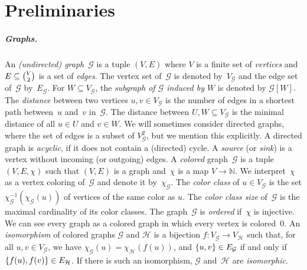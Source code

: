 \documentclass[10pt,a4paper]{article}
\newcommand{\defining}[1]{\emph{#1}}
\DeclarePairedDelimiter\set{\lbrace}{\rbrace}
\newcommand{\inv}[1]{#1^{-1}}
\newcommand{\nat}{\mathbb{N}}
\newcommand{\graphG}{\mathcal{G}}
\newcommand{\graphH}{\mathcal{H}}
\newcommand{\vertexG}{V_{\graphG}}
\newcommand{\vertexH}{V_{\graphH}}
\newcommand{\edgeG}{E_{\graphG}}
\newcommand{\edgeH}{E_{\graphH}}
\newcommand{\coloringG}{\chi_{\graphG}}
\newcommand{\coloringH}{\chi_{\graphH}}
\begin{document}
%
%
%
%
 
                
        \section{Preliminaries}\label{sec:preliminaries}
%


\subparagraph{Graphs.}
An \defining{(undirected) graph}~$\graphG$ is a tuple $(V,E)$ where $V$ is a finite set of \defining{vertices} 
and $E \subseteq \tbinom{V}{2}$ is a set of \defining{edges}.
The vertex set of~$\graphG$ is denoted by~$\vertexG$
and the edge set of~$\graphG$ by~$\edgeG$.
For $W \subseteq \vertexG$,
the \defining{subgraph of $\graphG$ induced by $W$} is denoted by $\graphG[W]$.
The \defining{distance} between two vertices $u,v \in \vertexG$
is the number of edges in a shortest path between~$u$ and~$v$ in~$\graphG$.
The distance between $U,W \subseteq \vertexG$
is the minimal distance of
all $u \in U$ and $v \in W$.
We will sometimes consider directed graphs,
where the set of edges is a subset of $\vertexG^2$,
but we mention this explicitly.
A directed graph is \defining{acyclic}, if it does not contain a (directed) cycle.
 A \defining{source} (or \defining{sink}) is a vertex without incoming (or outgoing) edges.
%
A \defining{colored} graph~$\graphG$ is a tuple $(V,E,\chi)$
such that $(V,E)$ is a graph and~$\chi$ is a map
$V \to \nat$.
We interpret~$\chi$ as a vertex coloring of~$\graphG$ and denote it by~$\coloringG$.
The \defining{color class} of $u \in \vertexG$
is the set $\inv{\coloringG}(\coloringG(u))$ of vertices of the same color as $u$.
The \defining{color class size} of~$\graphG$
is the maximal cardinality of its color classes.
The graph~$\graphG$ is \defining{ordered} if~$\chi$ is injective.
We can see every graph as a colored graph in which every vertex is colored~$0$.
%
An \defining{isomorphism} of colored graphs $\graphG$ and $\graphH$
is a bijection $f \colon \vertexG \to \vertexH$
such that,
for all $u,v\in\vertexG$, we have $\coloringG(u) = \coloringH(f(u))$, and $\set{u,v} \in \edgeG$
if and only if $\set{f(u),f(v)} \in \edgeH$.
If there is such an isomorphism, $\graphG$ and~$\graphH$ are \defining{isomorphic}.
\end{document}
